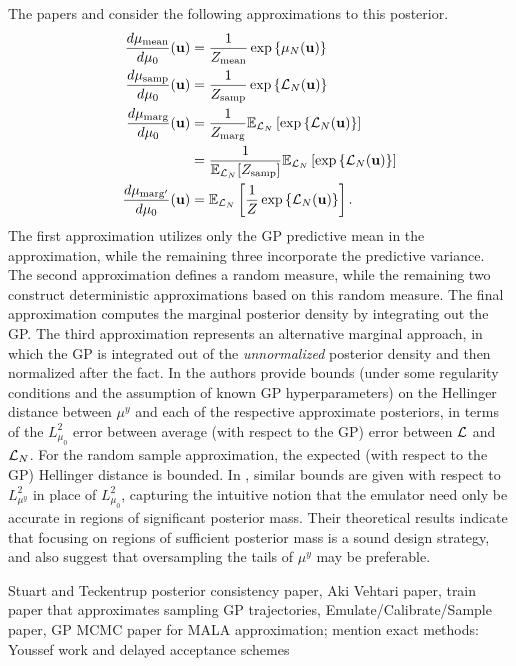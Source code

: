 \documentclass[12pt]{article}
\begin{document}
The papers \cite{StuartTeck1} and \cite{StuartTeck2} consider the following approximations to this posterior. 
\begin{align}
\frac{d\mu_{\text{mean}}}{d\mu_0}(\bpar) &= \frac{1}{Z_{\text{mean}}} \exp\left\{\GPMeanPred[\Ndesign](\bpar) \right\} \\
\frac{d\mu_{\text{samp}}}{d\mu_0}(\bpar) &= \frac{1}{Z_{\text{samp}}} \exp\left\{\llik_{\Ndesign}(\bpar)\right\} \\
\frac{d\mu_{\text{marg}}}{d\mu_0}(\bpar) &= \frac{1}{Z_{\text{marg}}}  \E_{\llik_{\Ndesign}}\left[\exp\left\{\llik_{\Ndesign}(\bpar)\right\}\right] \\
 							      &=  \frac{1}{\E_{\llik_{\Ndesign}}[Z_{\text{samp}}]}  \E_{\llik_{\Ndesign}}\left[\exp\left\{\llik_{\Ndesign}(\bpar)\right\}\right] \nonumber \\
\frac{d\mu_{\text{marg}^\prime}}{d\mu_0}(\bpar) &= \E_{\llik_{\Ndesign}}\left[\frac{1}{Z} \exp\left\{\llik_{\Ndesign}(\bpar)\right\}\right].
\end{align}
The first approximation utilizes only the GP predictive mean in the approximation, while the remaining three incorporate the predictive variance. 
The second approximation defines a random measure, while the remaining two construct deterministic approximations based on this random measure. 
The final approximation computes the marginal posterior density by integrating out the GP. The third approximation represents an alternative marginal 
approach, in which the GP is integrated out of the \textit{unnormalized} posterior density and then normalized after the fact. In \cite{StuartTeck1} the authors
provide bounds (under some regularity conditions and the assumption of known GP hyperparameters)
on the Hellinger distance between $\mu^y$ and each of the respective approximate posteriors, in terms of the $L^2_{\mu_0}$ error between 
average (with respect to the GP) error between $\llik$ and $\llik_{\Ndesign}$. 
For the random sample approximation, the expected (with respect to the GP) Hellinger distance is bounded. In \cite{StuartTeck2}, similar bounds are given 
with respect to $L^2_{\mu^y}$ in place of $L^2_{\mu_0}$, capturing the intuitive notion that the emulator need only be accurate in regions of significant 
posterior mass. Their theoretical results indicate that focusing on regions of sufficient posterior mass is a sound design strategy, and also suggest that 
oversampling the tails of $\mu^y$ may be preferable. 


Stuart and Teckentrup posterior consistency paper, Aki Vehtari paper, train paper that approximates sampling GP trajectories, Emulate/Calibrate/Sample paper, 
GP MCMC paper for MALA approximation; mention exact methods: Youssef work and delayed acceptance schemes 
\end{document}
